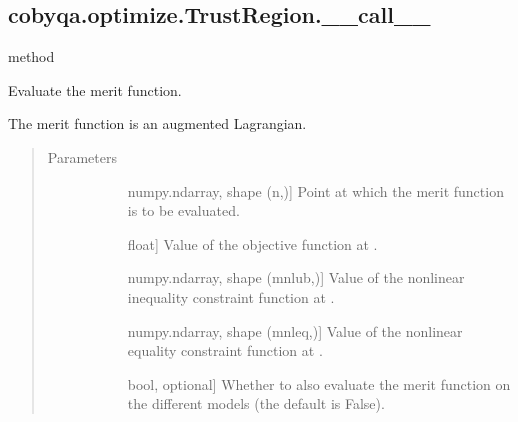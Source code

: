 \documentclass[letterpaper,10pt,english]{sphinxmanual}
\begin{document}
\begin{fulllineitems}
\subsection{cobyqa.optimize.TrustRegion.\_\_call\_\_}
\label{\detokenize{refs/generated/cobyqa.optimize.TrustRegion.__call__:cobyqa-optimize-trustregion-call}}\label{\detokenize{refs/generated/cobyqa.optimize.TrustRegion.__call__::doc}}
\sphinxAtStartPar
method

\begin{fulllineitems}
\label{\detokenize{refs/generated/cobyqa.optimize.TrustRegion.__call__:cobyqa.optimize.TrustRegion.__call__}}
\sphinxAtStartPar
Evaluate the merit function.

\sphinxAtStartPar
The merit function is an augmented Lagrangian.
\begin{quote}\begin{description}
\item[{Parameters}] \leavevmode\begin{description}
\item[{}] \leavevmode{[}numpy.ndarray, shape (n,){]}
\sphinxAtStartPar
Point at which the merit function is to be evaluated.

\item[{}] \leavevmode{[}float{]}
\sphinxAtStartPar
Value of the objective function at .

\item[{}] \leavevmode{[}numpy.ndarray, shape (mnlub,){]}
\sphinxAtStartPar
Value of the nonlinear inequality constraint function at .

\item[{}] \leavevmode{[}numpy.ndarray, shape (mnleq,){]}
\sphinxAtStartPar
Value of the nonlinear equality constraint function at .

\item[{}] \leavevmode{[}bool, optional{]}
\sphinxAtStartPar
Whether to also evaluate the merit function on the different models
(the default is False).


\end{description}
\end{description}
\end{quote}
\end{fulllineitems}
\end{fulllineitems}
\end{document}
